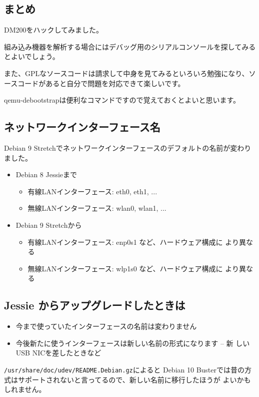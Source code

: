 \documentclass[mingoth,a4paper]{jsarticle}
\begin{document}
\subsection{まとめ}

DM200をハックしてみました。

組み込み機器を解析する場合にはデバッグ用のシリアルコンソールを探してみるとよいでしょう。

また、GPLなソースコードは請求して中身を見てみるといろいろ勉強になり、ソースコードがあると自分で問題を対応できて楽しいです。

qemu-debootstrapは便利なコマンドですので覚えておくとよいと思います。


\subsection{ネットワークインターフェース名}
 
Debian 9 Stretchでネットワークインターフェースのデフォルトの名前が変わりました。

 \begin{itemize}
  \item Debian 8 Jessieまで
	\begin{itemize}
	 \item 有線LANインターフェース: eth0, eth1, ...
	 \item 無線LANインターフェース: wlan0, wlan1, ...
	\end{itemize}
  \item Debian 9 Stretchから
	\begin{itemize}
	 \item 有線LANインターフェース: enp0s1 など、ハードウェア構成に
	       より異なる
	 \item 無線LANインターフェース: wlp1s0 など、ハードウェア構成に
	       より異なる
	\end{itemize} 
 \end{itemize}

\subsection{Jessie からアップグレードしたときは}

 \begin{itemize}
  \item 今まで使っていたインターフェースの名前は変わりません
  \item 今後新たに使うインターフェースは新しい名前の形式になります -- 新
	しいUSB NICを差したときなど
 \end{itemize}
 \texttt{/usr/share/doc/udev/README.Debian.gz}によると
 Debian 10 Busterでは昔の方式はサポートされないと言ってるので、新しい名前に移行したほうが
 よいかもしれません。
\end{document}
